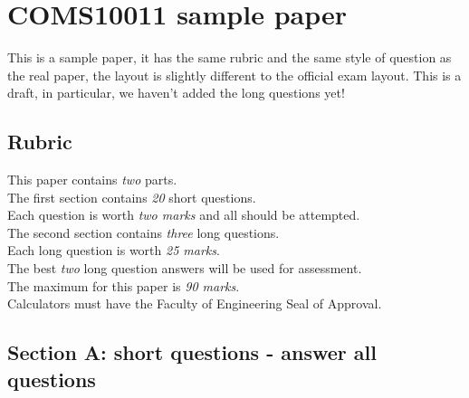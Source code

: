 \documentclass{article}
\begin{document}
\section*{COMS10011 sample paper}

This is a sample paper, it has the same rubric and the same style of
question as the real paper, the layout is slightly different to the
official exam layout. This is a draft, in particular, we haven't added the long questions yet!

\subsection*{Rubric}{
This paper contains \emph{two} parts. \\
The first section contains \emph {20} short questions.\\ 
Each question is worth \emph{two marks} and all should be attempted.\\
The second section contains \emph {three} long questions.\\
Each long question is worth \emph{25 marks}.\\
The best \emph{two} long question answers will be used for assessment. \\
The maximum for this paper is \emph{90 marks}. \\
Calculators must have the Faculty of Engineering Seal of Approval.}


\subsection*{Section A: short questions - answer all questions}
\end{document}
